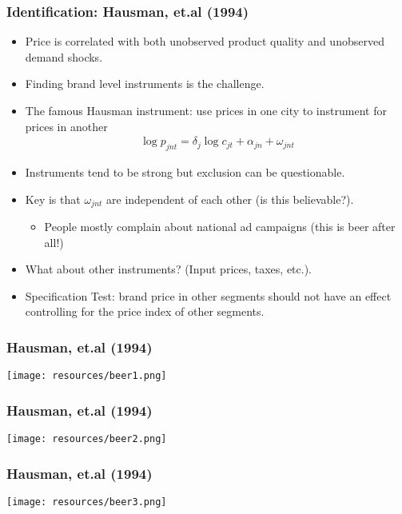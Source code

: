 \begin{frame}
\frametitle{Identification: Hausman, et.al (1994)}
\small
\begin{itemize}
\item Price is correlated with both \alert{unobserved product quality} and \alert{unobserved demand shocks}.
\item Finding brand level instruments is the challenge.
\item The famous \alert{Hausman instrument}: use prices in one city to instrument for prices in another
\begin{eqnarray*}
\log p_{jnt} = \delta_j \log c_{jt} + \alpha_{jn} + \omega_{jnt}
\end{eqnarray*}
\item Instruments tend to be \alert{strong} but \alert{exclusion} can be questionable.
\item Key is that $\omega_{jnt}$ are independent of each other (is this believable?).
\begin{itemize}
\item People mostly complain about national ad campaigns (this is beer after all!)
\end{itemize}
\item What about other instruments? (Input prices, taxes, etc.).
\item Specification Test: brand price in other segments should not have an effect controlling for the price index of other segments.
\end{itemize}
\end{frame}


\begin{frame}
\frametitle{Hausman, et.al (1994)}
\begin{center}
\texttt{[image: resources/beer1.png]}
\end{center}
\end{frame}

\begin{frame}
\frametitle{Hausman, et.al (1994)}
\begin{center}
\texttt{[image: resources/beer2.png]}
\end{center}
\end{frame}

\begin{frame}
\frametitle{Hausman, et.al (1994)}
\begin{center}
\texttt{[image: resources/beer3.png]}
\end{center}
\end{frame}

